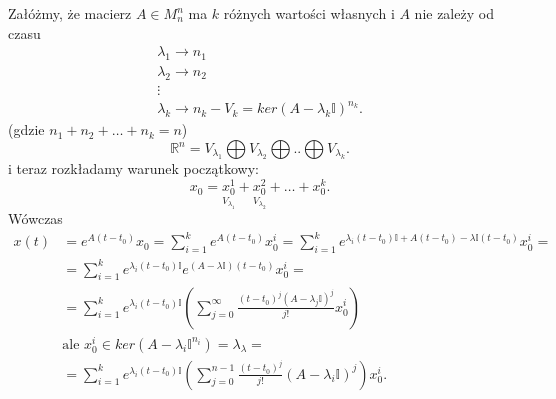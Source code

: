 \documentclass[../main.tex]{subfiles}
\begin{document}
Załóżmy, że macierz $A\in M^n_n$ ma $k$ różnych wartości własnych i $A$ nie zależy od czasu
\begin{align*}
    \lambda_1\rightarrow n_1\\
    \lambda_2\rightarrow n_2\\
    \vdots\\
    \lambda_k\rightarrow n_k - V_k = ker(A-\lambda_k \mathbb{I})^{n_k}
.\end{align*}
(gdzie $n_1+n_2+\ldots+n_k = n$)
\[
    \mathbb{R}^n = V_{\lambda_1} \bigoplus V_{\lambda_2} \bigoplus ..\bigoplus V_{\lambda_k}
.\]
i teraz rozkładamy warunek początkowy:
\[
    x_0 = \underset{V_{\lambda_1}}{x_0^1}  + \underset{V_{\lambda_2}}{x_0^{2}} +\ldots+x_0^{k}
.\]
Wówczas
\begin{align*}
    x(t) &= e^{A(t-t_0)}x_0 = \sum_{i=1}^{k} e^{A(t-t_0)}x_0^i = \sum_{i=1}^k e^{\lambda_i(t-t_0)\mathbb{I}+A(t-t_0) - \lambda\mathbb{I}(t-t_0)}x_0^i=\\
         &=\sum_{i=1}^k e^{\lambda_i(t-t_0)\mathbb{I}}e^{(A-\lambda\mathbb{I})(t-t_0)}x_0^i=\\
         &=\sum_{i=1}^k e^{\lambda_i(t-t_0)\mathbb{I}}\left( \sum_{j=0}^{\infty} \frac{(t-t_0)^j (A-\lambda_j \mathbb{I})^j}{j!} x_0^i \right)\\
         &\text{ale $x_0^i\in ker(A-\lambda_i\mathbb{I}^{n_i}) = \lambda_\lambda$}=\\
         &=\sum_{i=1}^k e^{\lambda_i(t-t_0)\mathbb{I}}\left( \sum_{j=0}^{n-1}\frac{(t-t_0)^j}{j!}(A-\lambda_i \mathbb{I})^j \right)x_0^i
.\end{align*}
\end{document}
